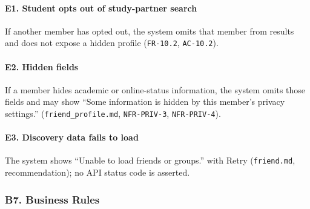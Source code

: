 \documentclass[12pt]{article}
\begin{document}
\hypertarget{sec:e1-student-opts-out-of-study-partner-search}{}
\paragraph*{E1. Student opts out of study-partner search}
\par\medskip

If another member has opted out, the system omits that member from results and does not expose a hidden profile (\texttt{FR-10.2}, \texttt{AC-10.2}).
\par\medskip

\hypertarget{sec:e2-hidden-fields}{}
\paragraph*{E2. Hidden fields}
\par\medskip

If a member hides academic or online-status information, the system omits those fields and may show “Some information is hidden by this member's privacy settings.” (\texttt{friend\_profile.md}, \texttt{NFR-PRIV-3}, \texttt{NFR-PRIV-4}).
\par\medskip

\hypertarget{sec:e3-discovery-data-fails-to-load}{}
\paragraph*{E3. Discovery data fails to load}
\par\medskip

The system shows “Unable to load friends or groups.” with Retry (\texttt{friend.md}, recommendation); no API status code is asserted.
\par\medskip

\hypertarget{sec:b7-business-rules}{}
\subsubsection*{B7. Business Rules}
\par\medskip
\end{document}
